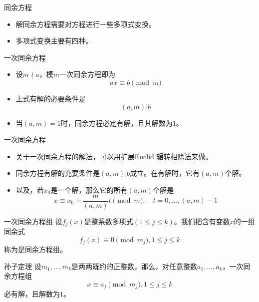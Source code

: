 \documentclass[dvipdfmx]{beamer}
\begin{document}
\begin{frame}{同余方程}
\begin{itemize}
\item 解同余方程需要对方程进行一些多项式变换。
\item 多项式变换主要有四种。
\end{itemize}
\end{frame}

\begin{frame}{一次同余方程}
\begin{itemize}
\item 设$m\nmid a$，模$m$一次同余方程即为
\begin{displaymath}
ax\equiv b\pmod{m}
\end{displaymath}
\pause
\item 上式有解的必要条件是
\begin{displaymath}
(a,m)|b
\end{displaymath}
\item 当$(a,m)=1$时，同余方程必定有解，且其解数为$1$。
\end{itemize}
\end{frame}

\begin{frame}{一次同余方程}
\begin{itemize}
\item 关于一次同余方程的解法，可以用扩展Euclid 辗转相除法来做。
\item 同余方程有解的充要条件是$(a,m)|b$成立。在有解时，它有$(a,m)$个解。
\item 以及，若$x_0$是一个解，那么它的所有$(a,m)$个解是
\begin{displaymath}
x\equiv x_0+\frac{m}{(a,m)}t\pmod{m},\quad t=0,\dotsc,(a,m)-1
\end{displaymath}
\end{itemize}
\end{frame}

\begin{frame}{一次同余方程组}
设$f_j(x)$是整系数多项式$(1\leq j\leq k)$。我们把含有变数$x$的一组同余式
\begin{displaymath}
f_j(x)\equiv 0\pmod{m_j}, 1\leq j\leq k
\end{displaymath}
称为是同余方程组。
\end{frame}

\begin{frame}{孙子定理}
设$m_1,\dotsc,m_k$是两两既约的正整数，那么，对任意整数$a_1,\dotsc,a_k$，一次同余方程组
\begin{displaymath}
x\equiv a_j \pmod{m_j}, 1\leq j\leq k
\end{displaymath}
必有解，且解数为$1$。
\end{frame}
\end{document}
